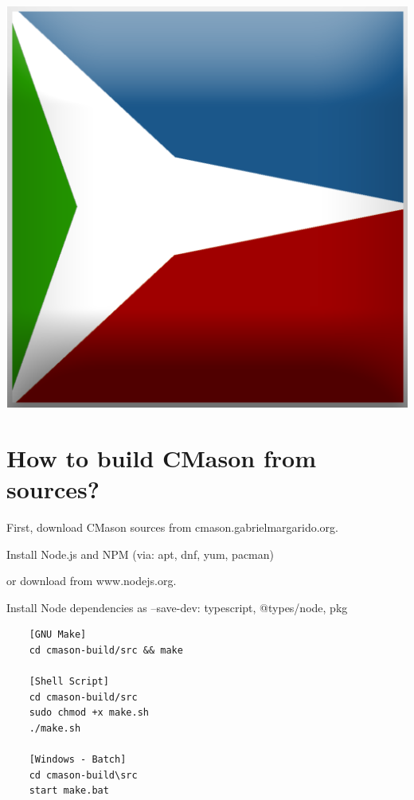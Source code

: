 \documentclass[]{article}
\title{}
\author{}
\begin{document}
\maketitle

\begin{center}
	\includegraphics[scale=0.5]{cmason3.png}
\end{center}

\section{How to build CMason from sources?}
First, download CMason sources from cmason.gabrielmargarido.org.

Install Node.js and NPM (via: apt, dnf, yum, pacman)

or download from www.nodejs.org. 

Install Node dependencies as --save-dev: typescript, @types/node, pkg
\begin{verbatim}
	[GNU Make]
	cd cmason-build/src && make
	
	[Shell Script]
	cd cmason-build/src
	sudo chmod +x make.sh
	./make.sh
	
	[Windows - Batch]
	cd cmason-build\src
	start make.bat
	
	
\end{verbatim}
\newpage
\end{document}
